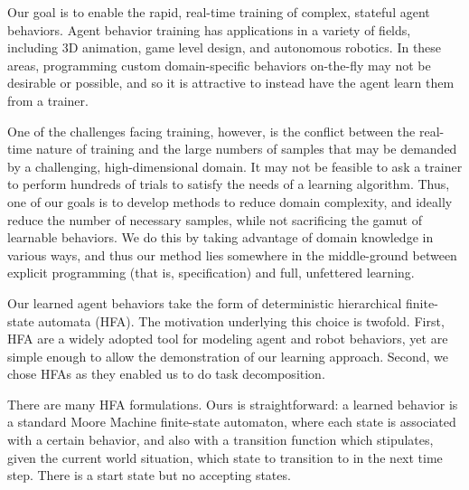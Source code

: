\documentclass{aamas2010_cameraReady}
\begin{document}
Our goal is to enable the rapid, real-time training of complex, stateful agent behaviors.  Agent behavior training has applications in a variety of fields, including 3D animation, game level design, and autonomous robotics.  In these areas, programming custom domain-specific behaviors on-the-fly may not be desirable or possible, and so it is attractive to instead have the agent learn them from a trainer.

One of the challenges facing training, however, is the conflict between the real-time nature of training and the large numbers of samples that may be demanded by a challenging, high-dimensional domain.  It may not be feasible to ask a trainer to perform hundreds of trials to satisfy the needs of a learning algorithm.  Thus, one of our goals is to develop methods to reduce domain complexity, and ideally reduce the number of necessary samples, while not sacrificing the gamut of learnable behaviors.  We do this by taking advantage of domain knowledge in various ways, and thus our method lies somewhere in the middle-ground between explicit programming (that is, specification) and full, unfettered learning.

Our learned agent behaviors take the form of deterministic hierarchical finite-state automata (HFA).  The motivation underlying this choice is twofold. First, HFA are a widely adopted tool for modeling agent and robot behaviors, yet are simple enough to allow the demonstration of our learning approach.  Second, we chose HFAs as they enabled us to do task decomposition.

There are many HFA formulations.  Ours is straightforward: a learned behavior is a standard Moore Machine finite-state automaton, where each state is associated with a certain behavior, and also with a transition function which stipulates, given the current world situation, which state to transition to in the next time step.  There is a start state but no accepting states.  

\end{document}
